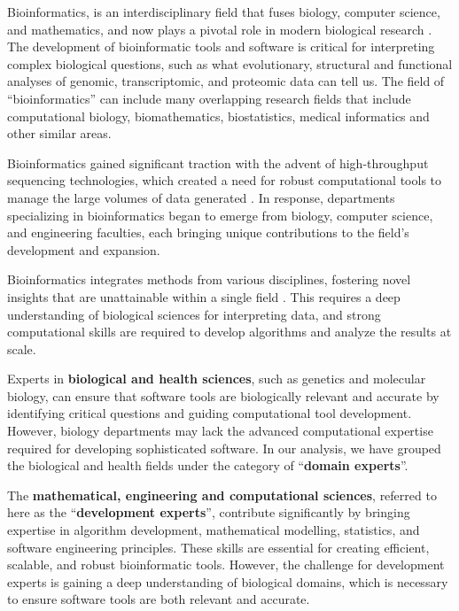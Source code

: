 \documentclass[fleqn,10pt,doc,onecolumn]{SelfArx}%
\begin{document}
Bioinformatics, is an interdisciplinary field that fuses biology,
computer science, and mathematics, and now plays a pivotal role in
modern biological research \cite{Ouzounis:2003}. The development of
bioinformatic tools and software is critical for interpreting complex
biological questions, such as what evolutionary, structural and
functional analyses of genomic, transcriptomic, and proteomic data can
tell us. The field of ``bioinformatics'' can include many overlapping
research fields that include computational biology, biomathematics,
biostatistics, medical informatics and other similar areas.

Bioinformatics gained significant traction with the advent of
high-throughput sequencing technologies, which created a need for
robust computational tools to manage the large volumes of data
generated \cite{Ouzounis:2003,hogeweg2011roots}. In response,
departments specializing in bioinformatics began to emerge from
biology, computer science, and engineering faculties, each bringing
unique contributions to the field's development and expansion.

Bioinformatics integrates methods from various disciplines, fostering
novel insights that are unattainable within a single field
\cite{mazzocchi2019scientific}. This requires a deep understanding of
biological sciences for interpreting data, and strong computational
skills are required to develop algorithms and analyze the results at
scale.


Experts in \textbf{biological and health sciences}, such as genetics
and molecular biology, can ensure that software tools are biologically
relevant and accurate by identifying critical questions and guiding
computational tool development. However, biology departments may lack
the advanced computational expertise required for developing
sophisticated software. In our analysis, we have grouped the
biological and health fields under the category of ``\textbf{domain
  experts}''.

The \textbf{mathematical, engineering and computational sciences},
referred to here as the ``\textbf{development experts}'', contribute
significantly by bringing expertise in algorithm development,
mathematical modelling, statistics, and software engineering
principles. These skills are essential for creating efficient,
scalable, and robust bioinformatic tools.  However, the challenge for
development experts is gaining a deep understanding of biological domains,
which is necessary to ensure software tools are both relevant
and accurate.
\end{document}
